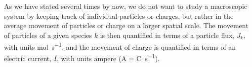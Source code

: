 



\section{}
\label{sec:Basics:Current} 
As we have stated several times by now, we do not want to study a macroscopic system by keeping track of individual particles or charges, but rather in the average movement of particles or charge on a larger spatial scale. The movement of particles of a given species $k$ is then quantified in terms of a particle flux, $J_k$, with units \si{\mole\per\second}, and the movement of charge is quantified in terms of an electric current, $I$, with units ampere (\si{\ampere} = \si{\coulomb\per\second}). 

